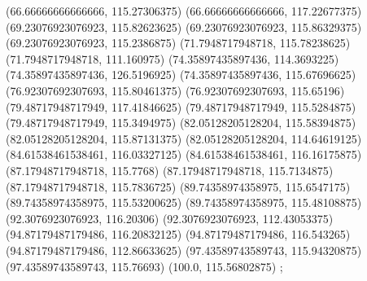 {{{		(66.66666666666666, 115.27306375)
		(66.66666666666666, 117.22677375)
		(69.23076923076923, 115.82623625)
		(69.23076923076923, 115.86329375)
		(69.23076923076923, 115.2386875)
		(71.7948717948718, 115.78238625)
		(71.7948717948718, 111.160975)
		(74.35897435897436, 114.3693225)
		(74.35897435897436, 126.5196925)
		(74.35897435897436, 115.67696625)
		(76.92307692307693, 115.80461375)
		(76.92307692307693, 115.65196)
		(79.48717948717949, 117.41846625)
		(79.48717948717949, 115.5284875)
		(79.48717948717949, 115.3494975)
		(82.05128205128204, 115.58394875)
		(82.05128205128204, 115.87131375)
		(82.05128205128204, 114.64619125)
		(84.61538461538461, 116.03327125)
		(84.61538461538461, 116.16175875)
		(87.17948717948718, 115.7768)
		(87.17948717948718, 115.7134875)
		(87.17948717948718, 115.7836725)
		(89.74358974358975, 115.6547175)
		(89.74358974358975, 115.53200625)
		(89.74358974358975, 115.48108875)
		(92.3076923076923, 116.20306)
		(92.3076923076923, 112.43053375)
		(94.87179487179486, 116.20832125)
		(94.87179487179486, 116.543265)
		(94.87179487179486, 112.86633625)
		(97.43589743589743, 115.94320875)
		(97.43589743589743, 115.76693)
		(100.0, 115.56802875)
	};

}}
